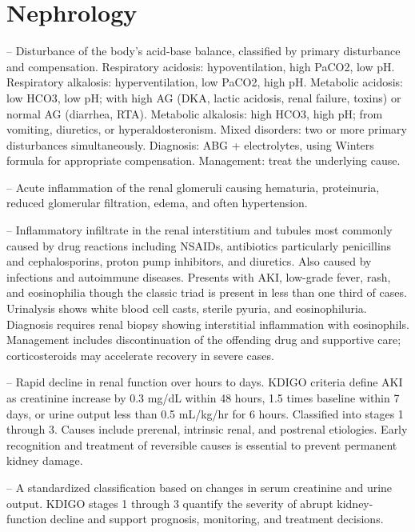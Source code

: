 \chapter{Nephrology}

-- Disturbance of the body's acid-base balance, classified by primary disturbance and compensation. Respiratory acidosis: hypoventilation, high PaCO2, low pH. Respiratory alkalosis: hyperventilation, low PaCO2, high pH. Metabolic acidosis: low HCO3, low pH; with high AG (DKA, lactic acidosis, renal failure, toxins) or normal AG (diarrhea, RTA). Metabolic alkalosis: high HCO3, high pH; from vomiting, diuretics, or hyperaldosteronism. Mixed disorders: two or more primary disturbances simultaneously. Diagnosis: ABG + electrolytes, using Winters formula for appropriate compensation. Management: treat the underlying cause.

-- Acute inflammation of the renal glomeruli causing hematuria, proteinuria, reduced glomerular filtration, edema, and often hypertension.

-- Inflammatory infiltrate in the renal interstitium and tubules most commonly caused by drug reactions including NSAIDs, antibiotics particularly penicillins and cephalosporins, proton pump inhibitors, and diuretics. Also caused by infections and autoimmune diseases. Presents with AKI, low-grade fever, rash, and eosinophilia though the classic triad is present in less than one third of cases. Urinalysis shows white blood cell casts, sterile pyuria, and eosinophiluria. Diagnosis requires renal biopsy showing interstitial inflammation with eosinophils. Management includes discontinuation of the offending drug and supportive care; corticosteroids may accelerate recovery in severe cases.

-- Rapid decline in renal function over hours to days. KDIGO criteria define AKI as creatinine increase by 0.3 mg/dL within 48 hours, 1.5 times baseline within 7 days, or urine output less than 0.5 mL/kg/hr for 6 hours. Classified into stages 1 through 3. Causes include prerenal, intrinsic renal, and postrenal etiologies. Early recognition and treatment of reversible causes is essential to prevent permanent kidney damage.

-- A standardized classification based on changes in serum creatinine and urine output. KDIGO stages 1 through 3 quantify the severity of abrupt kidney-function decline and support prognosis, monitoring, and treatment decisions.

